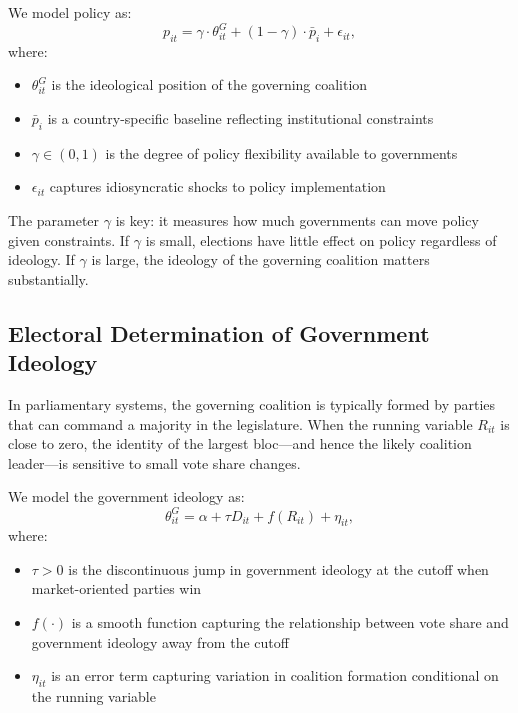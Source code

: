 \documentclass[12pt,a4paper]{article}
\begin{document}
We model policy as:
%
\begin{equation}
    p_{it} = \gamma \cdot \theta^G_{it} + (1 - \gamma) \cdot \bar{p}_i + 
    \epsilon_{it},
    \label{eq:policy}
\end{equation}
%
where:
\begin{itemize}[noitemsep]
    \item $\theta^G_{it}$ is the ideological position of the governing coalition
    \item $\bar{p}_i$ is a country-specific baseline reflecting institutional 
    constraints
    \item $\gamma \in (0, 1)$ is the degree of policy flexibility available 
    to governments
    \item $\epsilon_{it}$ captures idiosyncratic shocks to policy implementation
\end{itemize}

The parameter $\gamma$ is key: it measures how much governments can move 
policy given constraints. If $\gamma$ is small, elections have little effect 
on policy regardless of ideology. If $\gamma$ is large, the ideology of the 
governing coalition matters substantially.

\subsection{Electoral Determination of Government Ideology}

In parliamentary systems, the governing coalition is typically formed by 
parties that can command a majority in the legislature. When the running 
variable $R_{it}$ is close to zero, the identity of the largest bloc---and 
hence the likely coalition leader---is sensitive to small vote share changes.

We model the government ideology as:
%
\begin{equation}
    \theta^G_{it} = \alpha + \tau D_{it} + f(R_{it}) + \eta_{it},
    \label{eq:first_stage}
\end{equation}
%
where:
\begin{itemize}[noitemsep]
    \item $\tau > 0$ is the discontinuous jump in government ideology at the 
    cutoff when market-oriented parties win
    \item $f(\cdot)$ is a smooth function capturing the relationship between 
    vote share and government ideology away from the cutoff
    \item $\eta_{it}$ is an error term capturing variation in coalition formation 
    conditional on the running variable
\end{itemize}
\end{document}
